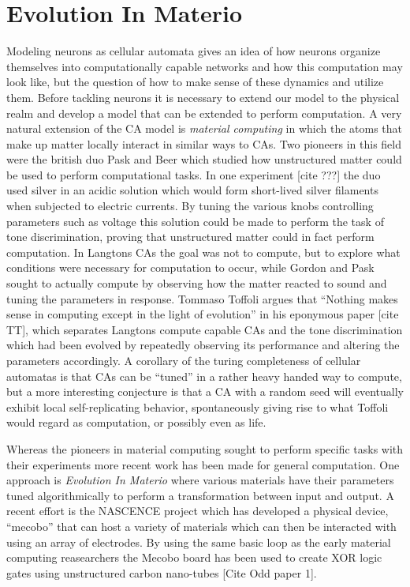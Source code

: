 \section{Evolution In Materio}
Modeling neurons as cellular automata gives an idea of how neurons organize
themselves into computationally capable networks and how this computation may
look like, but the question of how to make sense of these dynamics and utilize
them.
Before tackling neurons it is necessary to extend our model to the physical
realm and develop a model that can be extended to perform computation.
A very natural extension of the CA model is \emph{material computing} in which
the atoms that make up matter locally interact in similar ways to CAs.
%
Two pioneers in this field were the british duo Pask and Beer which studied how
unstructured matter could be used to perform computational tasks.
%
In one experiment [cite ???] the duo used silver in an acidic solution which
would form short-lived silver filaments when subjected to electric currents.
%
By tuning the various knobs controlling parameters such as voltage this solution
could be made to perform the task of tone discrimination, proving that
unstructured matter could in fact perform computation.
%
In Langtons CAs the goal was not to compute, but to explore what conditions were
necessary for computation to occur, while Gordon and Pask sought to actually
compute by observing how the matter reacted to sound and tuning the parameters
in response.
%
Tommaso Toffoli argues that ``Nothing makes sense in computing except in the
light of evolution'' in his eponymous paper [cite TT], which separates Langtons
compute capable CAs and the tone discrimination which had been evolved by
repeatedly observing its performance and altering the parameters accordingly.
%
A corollary of the turing completeness of cellular automatas is that CAs can be
``tuned'' in a rather heavy handed way to compute, but a more interesting
conjecture is that a CA with a random seed will eventually exhibit local
self-replicating behavior, spontaneously giving rise to what Toffoli would
regard as computation, or possibly even as life.\par
%
Whereas the pioneers in material computing sought to perform specific tasks with
their experiments more recent work has been made for general computation.
One approach is \emph{Evolution In Materio} where various materials have their
parameters tuned algorithmically to perform a transformation between input and
output.
A recent effort is the NASCENCE project which has developed a physical device,
``mecobo'' that can host a variety of materials which can then be interacted
with using an array of electrodes.
By using the same basic loop as the early material computing reasearchers the
Mecobo board has been used to create XOR logic gates using unstructured carbon
nano-tubes [Cite Odd paper 1].

